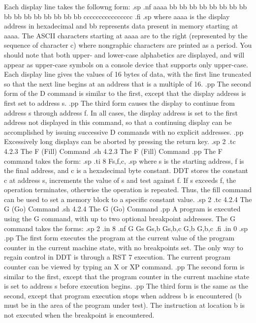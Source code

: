 Each display line takes the followng form:
.sp
.nf
aaaa bb bb bb bb bb bb bb bb bb bb bb bb bb bb bb bb cccccccccccccccc
.fi
.sp
where aaaa is the display address in hexadecimal and bb 
represents data present in memory starting at aaaa.  The ASCII 
characters starting at aaaa are to the right (represented by the 
sequence of character c) where nongraphic characters are printed as a 
period.  You should note that both upper- and lower-case 
alphabetics are displayed, and will appear as upper-case symbols 
on a console device that supports only upper-case.  Each display 
line gives the values of 16 bytes of data, with the first line 
truncated so that the next line begins at an address that is a 
multiple of 16.
.pp
The second form of the D command is similar to the first, except 
that the display address is first set to address s.
.pp
The third form causes the display to continue from address s 
through address f.  In all cases, the display address is set to 
the first address not displayed in this command, so that a 
continuing display can be accomplished by issuing successive D 
commands with no explicit addresses.
.pp
Excessively long displays can be aborted by pressing the return key.
.sp 2
.tc         4.2.3  The F (Fill) Command
.sh
4.2.3  The F (Fill) Command
.pp
The F command takes the form:
.sp
.ti 8
Fs,f,c,
.sp
where s is the starting address, f is the final address, and c is 
a hexadecimal byte constant.  DDT stores the constant c at 
address s, increments the value of s and test against f.  If s 
exceeds f, the operation terminates, otherwise the operation is 
repeated.  Thus, the fill command can be used to set a memory 
block to a specific constant value.
.sp 2
.tc         4.2.4  The G (Go) Command
.sh
4.2.4  The G (Go) Command
.pp
A program is executed using the G command, with up to two 
optional breakpoint addresses.  The G command takes the forms:
.sp 2
.in 8
.nf
G
Gs
Gs,b
Gs,b,c
G,b
G,b,c
.fi
.in 0
.sp
.pp
The first form executes the program at the current value of the 
program counter in the current machine state, with no breakpoints 
set.  The only way to regain control in DDT is through a RST 7 
execution.  The current program counter can be viewed by typing 
an X or XP command.
.pp
The second form is similar to the first, except that the program 
counter in the current machine state is set to address s before 
execution begins.
.pp
The third form is the same as the second, except that program 
execution stops when address b is encountered (b must be in the 
area of the program under test).  The instruction at location b is 
not executed when the breakpoint is encountered.
